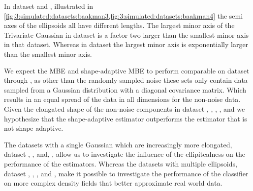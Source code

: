In dataset \baakmanFour and \baakmanFive, illustrated in \cref{fig:3:simulated:datasets:baakman3,fig:3:simulated:datasets:baakman4} the semi axes of the ellipsoids all have different lengths. The largest minor axis of the Trivariate Gaussian in dataset \baakmanFour is a factor two larger than the smallest minor axis in that dataset. Whereas in dataset \baakmanFive the largest minor axis is exponentially larger than the smallest minor axis. 

We expect the MBE and shape-adaptive MBE to perform comparable on dataset \ferdosiOne through \ferdosiThree, as other than the randomly sampled noise these sets only contain data sampled from a Gaussian distribution with a diagonal covariance matrix. Which results in an equal spread of the data in all dimensions for the non-noise data. 
Given the elongated shape of the non-noise components in dataset \baakmanOne, \baakmanTwo, \baakmanThree, \baakmanFour, and \baakmanFive we hypothesize that the shape-adaptive estimator outperforms the estimator that is not shape adaptive.

The datasets with a single Gaussian which are increasingly more elongated, \ie dataset \ferdosiOne, \baakmanOne, \baakmanFour and, \baakmanFive, allow us to investigate the influence of the ellipitcalness on the performance of the estimators. Whereas the datasets with multiple ellipsoids, \ie dataset \ferdosiTwo, \ferdosiThree, \baakmanTwo, and \baakmanThree, make it possible to investigate the performance of the classifier on more complex density fields that better approximate real world data. 